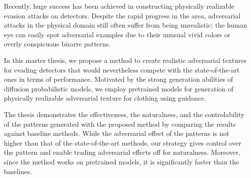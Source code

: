 

\begin{abstract}
   (TODO: autotranslated) 最近，在构建物理上可实现的探测器规避攻击方面取得了巨大成功。
   尽管该领域取得了快速进展，但物理领域的对抗性攻击仍然常常不切实际：人眼很容易发现对抗性示例，因为它们不寻常的鲜艳颜色或过于显眼的怪异图案。
  
   在这篇硕士论文中，我们提出了一种方法来创建真实的对抗纹理以逃避检测器，但在性能方面仍可与最先进的检测器竞争。
   受扩散概率模型强大生成能力的启发，我们采用预训练模型，通过指导生成物理上可实现的服装对抗纹理。
  
   论文通过将结果与基线方法进行比较，证明了所提出的方法生成的模式的有效性、自然性和可控性。
   虽然模式的对抗效应并不高于最先进的方法，但我们的策略可以控制模式并能够以自然性来交换对抗效应。
   此外，由于该方法适用于预训练模型，因此它比基线要快得多。

\end{abstract}

\begin{abstract*}
  Recently, huge success has been achieved in constructing physically realizable evasion attacks on detectors.
  Despite the rapid progress in the area, adversarial attacks in the physical domain still often suffer from being unrealistic: the human eye can easily spot adversarial examples due to their unusual vivid colors or overly conspicuous bizarre patterns.
  
  In this master thesis, we propose a method to create realistic adversarial textures for evading detectors that would nevertheless compete with the state-of-the-art ones in terms of performance.
  Motivated by the strong generation abilities of diffusion probabilistic models, we employ pretrained models for generation of physically realizable adversarial texture for clothing using guidance.
  
  The thesis demonstrates the effectiveness, the naturalness, and the controlability of the patterns generated with the proposed method by comparing the results against baseline methods.
  While the adversarial effect of the patterns is not higher than that of the state-of-the-art methods, our strategy gives control over the pattern and enable trading adversarial effects off for naturalness.
  Moreover, since the method works on pretrained models, it is significantly faster than the baselines.

\end{abstract*}
